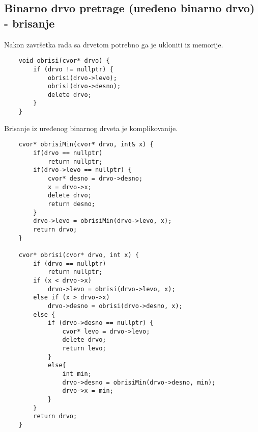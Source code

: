 \documentclass{article}
\begin{document}
\subsection{Binarno drvo pretrage (uređeno binarno drvo) - brisanje}
Nakon završetka rada sa drvetom potrebno ga je ukloniti iz memorije.
\begin{lstlisting}
    void obrisi(cvor* drvo) {
        if (drvo != nullptr) {
            obrisi(drvo->levo);
            obrisi(drvo->desno);
            delete drvo;
        }
    }
\end{lstlisting}
Brisanje iz uređenog binarnog drveta je komplikovanije.
\begin{lstlisting}
    cvor* obrisiMin(cvor* drvo, int& x) {
        if(drvo == nullptr) 
            return nullptr;
        if(drvo->levo == nullptr) {
            cvor* desno = drvo->desno;
            x = drvo->x;
            delete drvo;
            return desno;
        }
        drvo->levo = obrisiMin(drvo->levo, x);
        return drvo;
    }

    cvor* obrisi(cvor* drvo, int x) {
        if (drvo == nullptr)
            return nullptr;
        if (x < drvo->x)
            drvo->levo = obrisi(drvo->levo, x);
        else if (x > drvo->x)
            drvo->desno = obrisi(drvo->desno, x);
        else {
            if (drvo->desno == nullptr) {
                cvor* levo = drvo->levo;
                delete drvo;
                return levo;
            }
            else{
                int min;
                drvo->desno = obrisiMin(drvo->desno, min);
                drvo->x = min;
            }
        }
        return drvo;
    }
\end{lstlisting}
\end{document}
